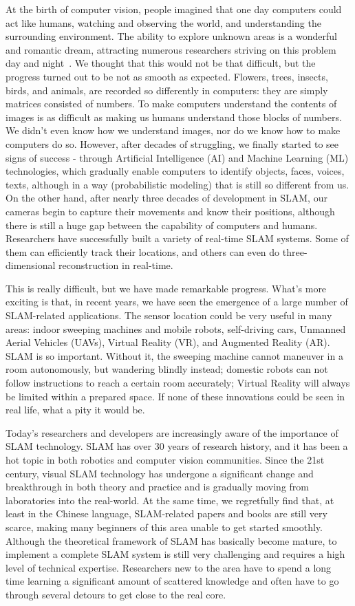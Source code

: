 At the birth of computer vision, people imagined that one day computers could act like humans, watching and observing the world, and understanding the surrounding environment. The ability to explore unknown areas is a wonderful and romantic dream, attracting numerous researchers striving on this problem day and night~\cite{Hartley2003}. We thought that this would not be that difficult, but the progress turned out to be not as smooth as expected. Flowers, trees, insects, birds, and animals, are recorded so differently in computers: they are simply matrices consisted of numbers. To make computers understand the contents of images is as difficult as making us humans understand those blocks of numbers. We didn't even know how we understand images, nor do we know how to make computers do so. However, after decades of struggling,  we finally started to see signs of success - through Artificial Intelligence (AI) and Machine Learning (ML) technologies, which gradually enable computers to identify objects, faces, voices, texts, although in a way (probabilistic modeling) that is still so different from us. On the other hand, after nearly three decades of development in SLAM, our cameras begin to capture their movements and know their positions, although there is still a huge gap between the capability of computers and humans. Researchers have successfully built a variety of real-time SLAM systems. Some of them can efficiently track their locations, and others can even do three-dimensional reconstruction in real-time.

This is really difficult, but we have made remarkable progress. What's more exciting is that, in recent years, we have seen the emergence of a large number of SLAM-related applications. The sensor location could be very useful in many areas: indoor sweeping machines and mobile robots, self-driving cars, Unmanned Aerial Vehicles (UAVs), Virtual Reality (VR), and Augmented Reality (AR). SLAM is so important. Without it, the sweeping machine cannot maneuver in a room autonomously, but wandering blindly instead; domestic robots can not follow instructions to reach a certain room accurately; Virtual Reality will always be limited within a prepared space. If none of these innovations could be seen in real life, what a pity it would be.

Today's researchers and developers are increasingly aware of the importance of SLAM technology. SLAM has over 30 years of research history, and it has been a hot topic in both robotics and computer vision communities. Since the 21st century, visual SLAM technology has undergone a significant change and breakthrough in both theory and practice and is gradually moving from laboratories into the real-world. At the same time, we regretfully find that, at least in the Chinese language, SLAM-related papers and books are still very scarce, making many beginners of this area unable to get started smoothly. Although the theoretical framework of SLAM has basically become mature, to implement a complete SLAM system is still very challenging and requires a high level of technical expertise. Researchers new to the area have to spend a long time learning a significant amount of scattered knowledge and often have to go through several detours to get close to the real core.

